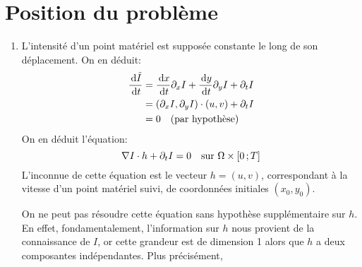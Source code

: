 \section{Position du problème}

\begin{enumerate}
\item L'intensité d'un point matériel est supposée constante le long de son déplacement. On en déduit:
\begin{align*}
  \dfrac{\, \mathrm{d} \tilde{I}}{\, \mathrm{d} t} &= \dfrac{\, \mathrm{d} x}{\, \mathrm{d} t} \partial_x I + \dfrac{\, \mathrm{d} y}{\, \mathrm{d} t} \partial_y I + \partial_t I \\
                             &= (\partial_x I, \partial_y I) \cdot (u, v) + \partial_t I \\
                             &= 0 \quad\text{(par hypothèse)}
\end{align*}
On en déduit l'équation:
\begin{equation}
  \label{eq:general}
  \nabla I \cdot h + \partial_t I = 0 \quad \text{sur } \Omega \times \interff{0}{T}
\end{equation}
L'inconnue de cette équation est le vecteur $h = (u,v)$, correspondant à la vitesse d'un point matériel suivi, de coordonnées initiales $(x_0, y_0)$. 

On ne peut pas résoudre cette équation sans hypothèse supplémentaire sur $h$. En effet, fondamentalement, l'information sur $h$ nous provient de la connaissance de $I$, or cette grandeur est de dimension 1 alors que $h$ a deux composantes indépendantes. Plus précisément, 
\end{enumerate}